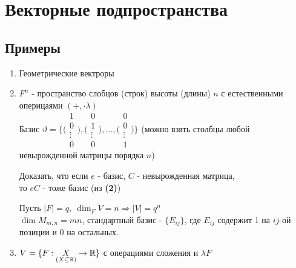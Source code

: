 \section{Векторные подпространства}
  \subsection{Примеры}
  \begin{enumerate}
    \item Геометрические вектроры
    \item $F^n$ - пространство слобцов (строк) высоты (длины) $n$ с естественными оперицаями $(+, \cdot \lambda)$ \vspace{0.4cm}\\
    Базис $\vartheta  = \bigg\{ \Biggl( \begin{smallmatrix}
      1 \\ 0 \\ \vdots \\ 0
    \end{smallmatrix}\Biggr), \Biggl(\begin{smallmatrix}
      0 \\ 1 \\ \vdots \\ 0
    \end{smallmatrix}\Biggr), ... , \Biggl(\begin{smallmatrix}
      0 \\ 0 \\ \vdots \\ 1
    \end{smallmatrix}\Biggr) \bigg\}$ (можно взять столбцы любой\vspace{0.3cm}\\ невырожденной матрицы порядка $n$)
    \begin{remark}
      Доказать, что если $e$ - базис, $C$ - невырожденная матрица,\\ то $eC$ - тоже базис (из \textbf{(2)})
    \end{remark} 
    \begin{exercise}
      Пусть $|F| = q, \ \dim_F V = n \Longrightarrow |V| = q^n$\\
      $\dim M_{m,n} = mn$, стандартный базис - $\{E_{ij}\}$, где $E_{ij}$ содержит 1 на $ij$-ой позиции и $0$ на остальных.  
    \end{exercise}
    \item $V = \{F:\underset{(X\subseteq \mathbb R)}{X} \to \mathbb R\}$ с операциями сложения и $\lambda F$\\

\end{enumerate}
